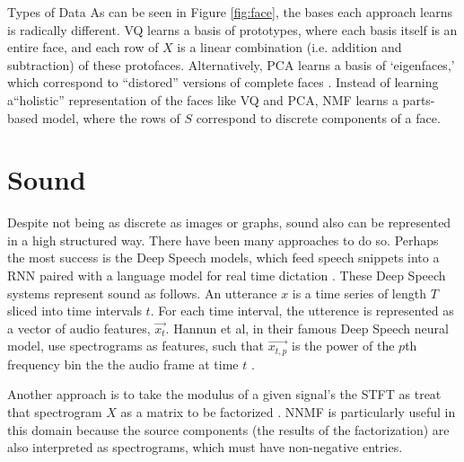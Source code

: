 \documentclass[12pt]{pom_thesis}
\begin{document}
\begin{chapter}{Types of Data}
As can be seen in Figure \ref{fig:face}, the bases each approach learns is radically different. VQ learns a basis of prototypes, where each basis itself is an entire face, and each row of $X$ is a linear combination (i.e. addition and subtraction) of these protofaces. Alternatively, PCA learns a basis of `eigenfaces,' which correspond to ``distored'' versions of complete faces \cite{turk1991eigenfaces}. Instead of learning a``holistic'' representation of the faces like VQ and PCA, NMF learns a parts-based model, where the rows of $S$ correspond to discrete components of a face. 

\section{Sound}
Despite not being as discrete as images or graphs, sound also can be represented in a high structured way. There have been many approaches to do so. Perhaps the most success is the Deep Speech models, which feed speech snippets into a RNN paired with a language model for real time dictation \cite{amodei2015deep,hannun2014deep}. These Deep Speech systems represent sound as follows. An utterance $x$ is a time series of length $T$	sliced into time intervals $t$. For each time interval, the utterence is represented as a vector of audio features, $\vec{x_t}$. Hannun et al, in their famous Deep Speech neural model, use spectrograms as features, such that $\vec{x_{t,p}}$ is the power of the $p$th frequency bin the the audio frame at time $t$ \cite{hannun2014deep}.

Another approach is to take the modulus of a given signal's the STFT as treat that spectrogram  $X$ as a matrix to be factorized \cite{kawamoto2000estimation,krause2015non}. NNMF is particularly useful in this domain because the source components (the results of the factorization) are also interpreted as spectrograms, which must have non-negative entries. 


\end{chapter}
\end{document}
